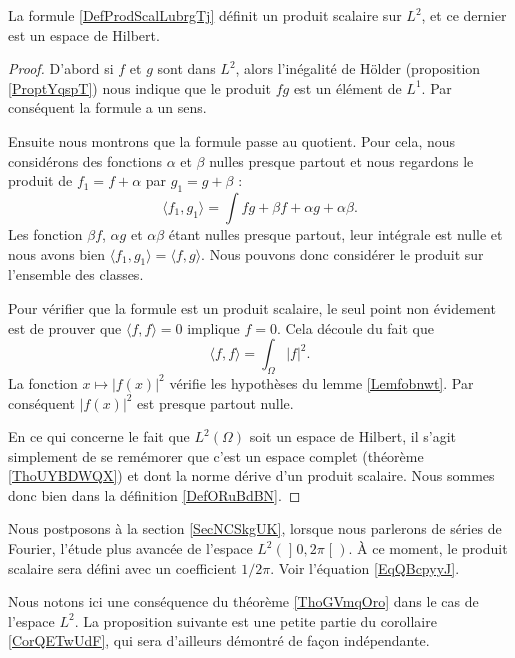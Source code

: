 \begin{lemma}
    La formule \eqref{DefProdScalLubrgTj} définit un produit scalaire sur \( L^2\), et ce dernier est un espace de Hilbert.
\end{lemma}

\begin{proof}
    D'abord si \( f\) et \( g\) sont dans \( L^2\), alors l'inégalité de Hölder (proposition \ref{ProptYqspT}) nous indique que le produit \( fg\) est un élément de \( L^1\). Par conséquent la formule a un sens.

    Ensuite nous montrons que la formule passe au quotient. Pour cela, nous considérons des fonctions \( \alpha\) et \( \beta\) nulles presque partout et nous regardons le produit de \( f_1=f+\alpha\) par \( g_1=g+\beta\) :
    \begin{equation}
        \langle f_1, g_1\rangle =\int fg+\beta f+\alpha g+ \alpha\beta.
    \end{equation}
    Les fonction \( \beta f\), \( \alpha g\) et \( \alpha\beta\) étant nulles presque partout, leur intégrale est nulle et nous avons bien \( \langle f_1, g_1\rangle =\langle f,g \rangle \). Nous pouvons donc considérer le produit sur l'ensemble des classes.

    Pour vérifier que la formule est un produit scalaire, le seul point non évidement est de prouver que \( \langle f, f\rangle =0\) implique \( f=0\). Cela découle du fait que
    \begin{equation}
        \langle f, f\rangle =\int_{\Omega}| f |^2.
    \end{equation}
    La fonction \( x\mapsto | f(x) |^2\) vérifie les hypothèses du lemme \ref{Lemfobnwt}. Par conséquent \( | f(x) |^2\) est presque partout nulle.

    En ce qui concerne le fait que \( L^2(\Omega)\) soit un espace de Hilbert, il s'agit simplement de se remémorer que c'est un espace complet (théorème  \ref{ThoUYBDWQX}) et dont la norme dérive d'un produit scalaire. Nous sommes donc bien dans la définition \ref{DefORuBdBN}.
\end{proof}

Nous postposons à la section \ref{SecNCSkgUK}, lorsque nous parlerons de séries de Fourier, l'étude plus avancée de l'espace \( L^2(\mathopen] 0 , 2\pi \mathclose[)\). À ce moment, le produit scalaire sera défini avec un coefficient \( 1/2\pi\). Voir l'équation \eqref{EqQBcpyyJ}.

Nous notons ici une conséquence du théorème \ref{ThoGVmqOro} dans le cas de l'espace \( L^2\). La proposition suivante est une petite partie du corollaire \ref{CorQETwUdF}, qui sera d'ailleurs démontré de façon indépendante.

